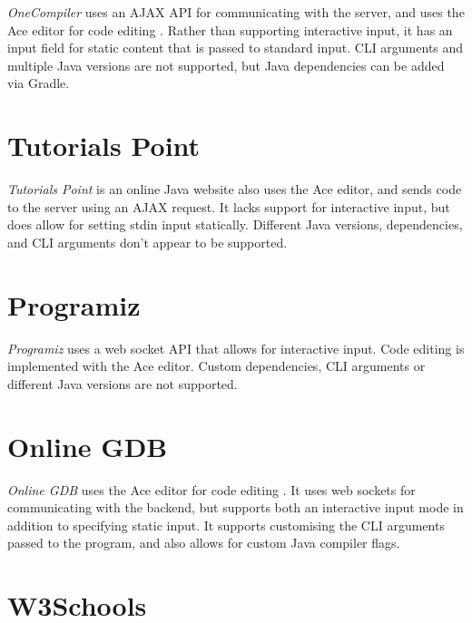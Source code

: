\emph{OneCompiler} uses an AJAX API for communicating with the server, and uses the Ace editor for code editing \cite{one-compiler-pvt-ltd-2022}. Rather than supporting interactive input, it has an input field for static content that is passed to standard input. CLI arguments and multiple Java versions are not supported, but Java dependencies can be added via Gradle.


\section{Tutorials Point}

\emph{Tutorials Point} \cite{tutorials-point-2022} is an online Java website also uses the Ace editor, and sends code to the server using an AJAX request. It lacks support for interactive input, but does allow for setting stdin input statically. Different Java versions, dependencies, and CLI arguments don't appear to be supported.


\section{Programiz}

\emph{Programiz} \cite{programiz-2022} uses a web socket API that allows for interactive input. Code editing is implemented with the Ace editor. Custom dependencies, CLI arguments or different Java versions are not supported.


\section{Online GDB}

\emph{Online GDB} uses the Ace editor for code editing \cite{gdb-online-2022}. It uses web sockets for communicating with the backend, but supports both an interactive input mode in addition to specifying static input. It supports customising the CLI arguments passed to the program, and also allows for custom Java compiler flags.


\section{W3Schools}

